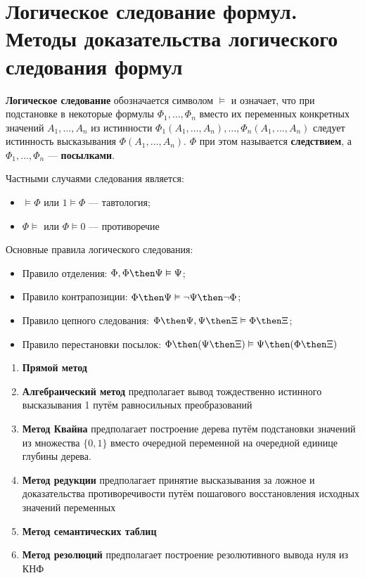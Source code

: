 \section{Логическое следование формул. Методы доказательства логического следования формул}
\dftion \textbf{Логическое следование} обозначается символом $\vDash$ и означает, что при подстановке в некоторые формулы $\Phi_1, \dots, \Phi_n$ вместо их переменных конкретных значений $A_1, \dots, A_n$ из истинности $\Phi_1(A_1,\dots,A_n),\dots,\Phi_n(A_1,\dots,A_n)$ следует истинность высказывания $\Phi(A_1,\dots,A_n)$. $\Phi$ при этом называется \textbf{следствием}, а $\Phi_1, \dots, \Phi_n$ --- \textbf{посылками}.

Частными случаями следования является:
\begin{itemize}
    \item $\vDash \Phi$ или $1 \vDash \Phi$ --- тавтология;
    \item $\Phi \vDash$ или $\Phi \vDash 0$ --- противоречие
\end{itemize}

Основные правила логического следования:
\begin{itemize}
    \item Правило отделения: $\Phi, \Phi \then \Psi \vDash \Psi$;
    \item Правило контрапозиции: $\Phi \then \Psi \vDash \lnot \Psi \then \lnot \Phi$;
    \item Правило цепного следования: $\Phi \then \Psi, \Psi \then \Xi \vDash \Phi \then \Xi$;
    \item Правило перестановки посылок: $\Phi \then (\Psi \then \Xi) \vDash \Psi \then (\Phi \then \Xi)$
\end{itemize}

\begin{enumerate}
    \item \textbf{Прямой метод}
    \item \textbf{Алгебраический метод} предполагает вывод тождественно истинного высказывания 1 путём равносильных преобразований
    \item \textbf{Метод Квайна} предполагает построение дерева путём подстановки значений из множества $\{0,1\}$ вместо очередной переменной на очередной единице глубины дерева.
    \item \textbf{Метод редукции} предполагает принятие высказывания за ложное и доказательства противоречивости путём пошагового восстановления исходных значений переменных
    \item \textbf{Метод семантических таблиц}
    \item \textbf{Метод резолюций} предполагает построение резолютивного вывода нуля из КНФ
\end{enumerate}